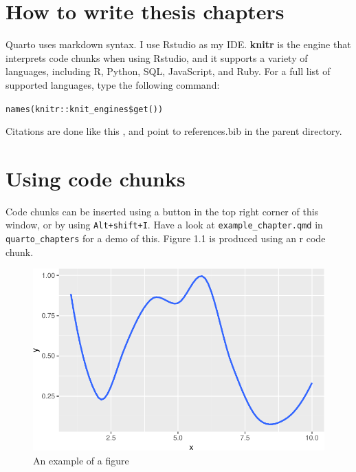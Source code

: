 \documentclass[../main.tex]{subfiles}
\begin{document}
\ifdefined\Shaded\renewenvironment{Shaded}{\begin{tcolorbox}[sharp corners, frame hidden, boxrule=0pt, interior hidden, borderline west={3pt}{0pt}{shadecolor}, enhanced, breakable]}{\end{tcolorbox}}\fi

\hypertarget{how-to-write-thesis-chapters}{%
\section{How to write thesis
chapters}\label{how-to-write-thesis-chapters}}

Quarto uses markdown syntax. I use Rstudio as my IDE. \textbf{knitr} is
the engine that interprets code chunks when using Rstudio, and it
supports a variety of languages, including R, Python, SQL, JavaScript,
and Ruby. For a full list of supported languages, type the following
command:

\texttt{names(knitr::knit\_engines\$get())}

Citations are done like this \cite{strain_2023}, and point to
references.bib in the parent directory.

\hypertarget{using-code-chunks}{%
\section{Using code chunks}\label{using-code-chunks}}

Code chunks can be inserted using a button in the top right corner of
this window, or by using \texttt{Alt+shift+I}. Have a look at
\texttt{example\_chapter.qmd} in \texttt{quarto\_chapters} for a demo of
this. Figure 1.1 is produced using an r code chunk.

\begin{figure}

{\centering \includegraphics{example_chapter_files/figure-latex/my-code-chunk-1.pdf}

}

\caption{An example of a figure}

\end{figure}
\end{document}
